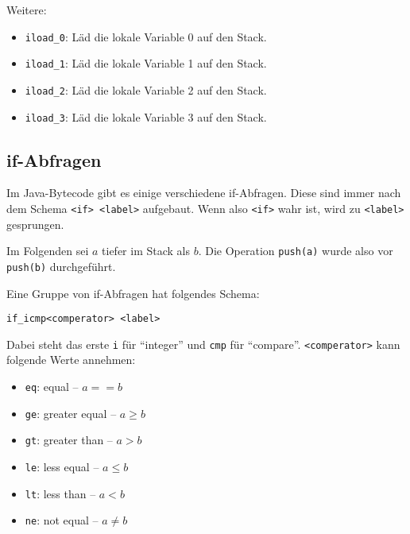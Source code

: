 Weitere:%

\begin{itemize}
    \item \texttt{iload\_0}: Läd die lokale Variable 0 auf den Stack.
    \item \texttt{iload\_1}: Läd die lokale Variable 1 auf den Stack.
    \item \texttt{iload\_2}: Läd die lokale Variable 2 auf den Stack.
    \item \texttt{iload\_3}: Läd die lokale Variable 3 auf den Stack.
\end{itemize}

\subsection{if-Abfragen}%
Im Java-Bytecode gibt es einige verschiedene if-Abfragen. Diese sind immer nach
dem Schema \texttt{<if> <label>} aufgebaut. Wenn also \texttt{<if>} wahr ist,
wird zu \texttt{<label>} gesprungen.

Im Folgenden sei $a$ tiefer im Stack als $b$. Die Operation \texttt{push(a)} wurde also
vor \texttt{push(b)} durchgeführt.

Eine Gruppe von if-Abfragen hat folgendes Schema:

\begin{center}
    \texttt{if\_icmp<comperator> <label>}
\end{center}

Dabei steht das erste \texttt{i} für \enquote{integer} und \texttt{cmp} für
\enquote{compare}. \texttt{<comperator>} kann folgende Werte annehmen:

%
\begin{itemize}
    \item \texttt{eq}: equal -- $a == b$
    \item \texttt{ge}: greater equal -- $a \ge b$
    \item \texttt{gt}: greater than -- $a > b$
    \item \texttt{le}: less equal -- $a \le b$
    \item \texttt{lt}: less than -- $a < b$
    \item \texttt{ne}: not equal -- $a \neq b$
\end{itemize}


